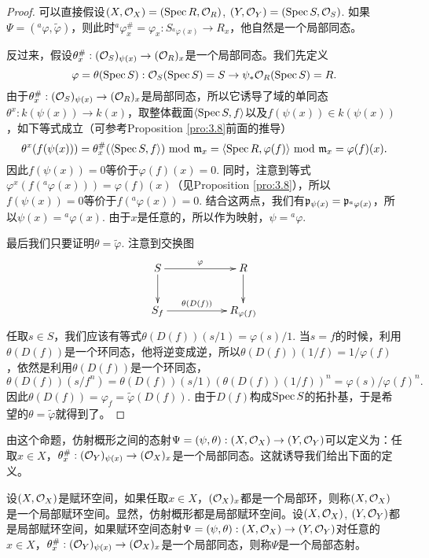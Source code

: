 \begin{proof}
可以直接假设$(X,\mathcal{O}_X)=(\operatorname{Spec} R,\mathcal{O}_R)$, $(Y,\mathcal{O}_Y)=(\operatorname{Spec} S,\mathcal{O}_S)$. 如果$\Psi=({}^a\varphi,\widetilde{\varphi})$，则此时${}^a\varphi^\#_x=\varphi_x:S_{{}^a\varphi(x)}\to R_x$，他自然是一个局部同态。

反过来，假设$\theta_x^\#:(\mathcal{O}_S)_{\psi(x)}\to (\mathcal{O}_R)_x$是一个局部同态。我们先定义
\[
	\varphi=\theta(\operatorname{Spec} S):\mathcal{O}_S(\operatorname{Spec} S)=S\to \psi_*\mathcal{O}_R(\operatorname{Spec} S)=R.
\]
由于$\theta_x^\#:(\mathcal{O}_S)_{\psi(x)}\to (\mathcal{O}_R)_x$是局部同态，所以它诱导了域的单同态$\theta^x:k(\psi(x))\to k(x)$，取整体截面$\langle \operatorname{Spec} S,f\rangle$以及$f(\psi(x))\in k(\psi(x))$，如下等式成立（可参考Proposition \ref{pro:3.8}前面的推导）
\[
	\theta^x(f(\psi(x)))=\theta_x^\#(\langle \operatorname{Spec} S,f\rangle)\,\, \text{mod}\,\, \mathfrak{m}_x=\langle \operatorname{Spec} R,\varphi(f)\rangle \,\, \text{mod}\,\, \mathfrak{m}_x = \varphi(f)(x).
\]
因此$f(\psi(x))=0$等价于$\varphi(f)(x)=0$. 同时，注意到等式$\varphi^x(f({}^a\varphi(x)))=\varphi(f)(x)$（见Proposition \ref{pro:3.8}），所以$f(\psi(x))=0$等价于$f({}^a\varphi(x))=0$. 结合这两点，我们有$\mathfrak{p}_{\psi(x)}=\mathfrak{p}_{{}^a\varphi(x)}$，所以$\psi(x)={}^a\varphi(x)$. 由于$x$是任意的，所以作为映射，$\psi={}^a\varphi$.

最后我们只要证明$\theta=\widetilde{\varphi}$. 注意到交换图
\[
	\xymatrix{
	S\ar[d]\ar[rr]^-{\varphi}&&R\ar[d]\\
	S_{f}\ar[rr]^-{\theta(D(f))}&&R_{\varphi(f)}
	}
\]
任取$s\in S$，我们应该有等式$\theta(D(f))(s/1)=\varphi(s)/1$. 当$s=f$的时候，利用$\theta(D(f))$是一个环同态，他将逆变成逆，所以$\theta(D(f))(1/f)=1/\varphi(f)$，依然是利用$\theta(D(f))$是一个环同态，
\[
	\theta(D(f))(s/f^n)=\theta(D(f))(s/1)(\theta(D(f))(1/f))^n=\varphi(s)/\varphi(f)^n.
\]
因此$\theta(D(f))=\varphi_f=\widetilde{\varphi}(D(f))$. 由于$D(f)$构成$\operatorname{Spec} S$的拓扑基，于是希望的$\theta=\widetilde{\varphi}$就得到了。
\end{proof}

由这个命题，仿射概形之间的态射$\Psi=(\psi,\theta):(X,\mathcal{O}_X)\to (Y,\mathcal{O}_Y)$可以定义为：任取$x\in X$，$\theta_x^\#:(\mathcal{O}_Y)_{\psi(x)}\to (\mathcal{O}_X)_x$是一个局部同态。这就诱导我们给出下面的定义。

\begin{para}
设$(X,\mathcal{O}_X)$是赋环空间，如果任取$x\in X$，$(\mathcal{O}_X)_x$都是一个局部环，则称$(X,\mathcal{O}_X)$是一个局部赋环空间。显然，仿射概形都是局部赋环空间。设$(X,\mathcal{O}_X)$, $(Y,\mathcal{O}_Y)$都是局部赋环空间，如果赋环空间态射$\Psi=(\psi,\theta):(X,\mathcal{O}_X)\to (Y,\mathcal{O}_Y)$对任意的$x\in X$，$\theta_x^\#:(\mathcal{O}_Y)_{\psi(x)}\to (\mathcal{O}_X)_x$是一个局部同态，则称$\Psi$是一个局部态射。
\end{para}

